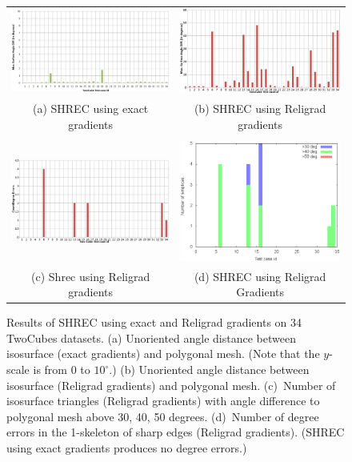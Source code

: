 \begin{figure}[tp]
\begin{tabular}{cc}
\includegraphics[width=0.45\linewidth]{images/tw1.eps} &
\includegraphics[width=0.45\linewidth]{images/tw2.eps} \\
(a) SHREC using exact gradients & (b) SHREC using Religrad gradients \\
\\
\includegraphics[height=0.25\linewidth]{images/tw3.eps} &
\includegraphics[height=0.25\linewidth]{images/twoCube35_test_1.eps} \\
(c) Shrec using Religrad gradients & (d) SHREC using Religrad Gradients
\end{tabular}

\caption{Results of SHREC using exact and Religrad gradients 
on 34 TwoCubes datasets. 
(a) Unoriented angle distance between isosurface (exact gradients)
and polygonal mesh.
(Note that the $y$-scale is from 0 to $10^\circ$.)
(b) Unoriented angle distance between isosurface (Religrad gradients)
and polygonal mesh.
(c)~Number of isosurface triangles (Religrad gradients)
with angle difference to polygonal mesh above 30, 40, 50 degrees.
(d)~Number of degree errors in the 1-skeleton of sharp edges
(Religrad gradients).
(SHREC using exact gradients produces no degree errors.)}
\label{fig:shrecTwoCube}

\end{figure}


